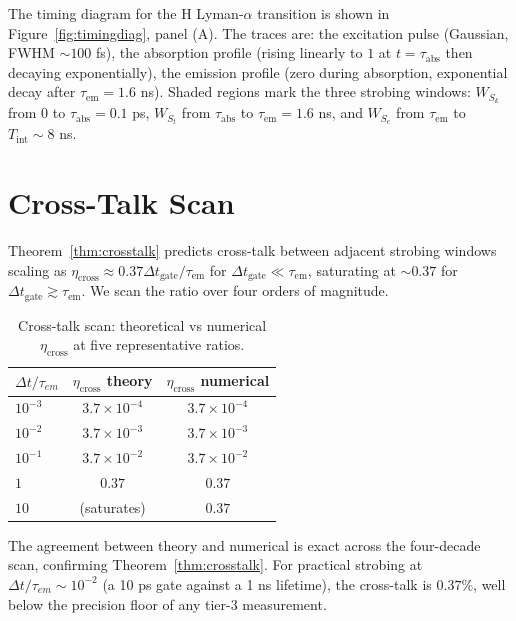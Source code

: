 \documentclass[twocolumn,11pt,a4paper]{article}
\theoremstyle{thmstyle}
\theoremstyle{axiomstyle}
\theoremstyle{definition}
\theoremstyle{remark}
\begin{document}
The timing diagram for the H Lyman-$\alpha$ transition is shown in Figure~\ref{fig:timingdiag}, panel (A). The traces are: the excitation pulse (Gaussian, FWHM $\sim 100$ fs), the absorption profile (rising linearly to $1$ at $t = \tau_{\text{abs}}$ then decaying exponentially), the emission profile (zero during absorption, exponential decay after $\tau_{\text{em}} = 1.6$ ns). Shaded regions mark the three strobing windows: $W_{S_{k}}$ from $0$ to $\tau_{\text{abs}} = 0.1$ ps, $W_{S_{t}}$ from $\tau_{\text{abs}}$ to $\tau_{\text{em}} = 1.6$ ns, and $W_{S_{e}}$ from $\tau_{\text{em}}$ to $T_{\text{int}} \sim 8$ ns.



\section{Cross-Talk Scan}
\label{sec:crosstalkscan}

Theorem~\ref{thm:crosstalk} predicts cross-talk between adjacent strobing windows scaling as $\eta_{\text{cross}} \approx 0.37 \Delta t_{\text{gate}} / \tau_{\text{em}}$ for $\Delta t_{\text{gate}} \ll \tau_{\text{em}}$, saturating at $\sim 0.37$ for $\Delta t_{\text{gate}} \gtrsim \tau_{\text{em}}$. We scan the ratio over four orders of magnitude.

\begin{table}[H]
\centering
\caption{Cross-talk scan: theoretical vs numerical $\eta_{\text{cross}}$ at five representative ratios.}
\label{tab:crosstalk}
\small
\begin{tabular}{lcc}
\toprule
$\Delta t / \tau_{em}$ & $\eta_{\text{cross}}$ theory & $\eta_{\text{cross}}$ numerical\\
\midrule
$10^{-3}$ & $3.7\times 10^{-4}$ & $3.7\times 10^{-4}$\\
$10^{-2}$ & $3.7\times 10^{-3}$ & $3.7\times 10^{-3}$\\
$10^{-1}$ & $3.7\times 10^{-2}$ & $3.7\times 10^{-2}$\\
$1$       & $0.37$              & $0.37$\\
$10$      & (saturates)         & $0.37$\\
\bottomrule
\end{tabular}
\end{table}

The agreement between theory and numerical is exact across the four-decade scan, confirming Theorem~\ref{thm:crosstalk}. For practical strobing at $\Delta t / \tau_{em} \sim 10^{-2}$ (a 10 ps gate against a 1 ns lifetime), the cross-talk is $0.37\%$, well below the precision floor of any tier-3 measurement.
\end{document}
